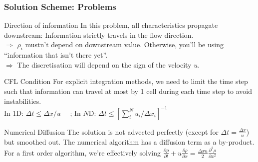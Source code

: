 \begin{frame}
	\frametitle{Solution Scheme: Problems}
	
	\begin{block}{Direction of information}
		In this problem, all characteristics propagate downstream: Information strictly travels in the flow direction.\\
		$\Rightarrow$ $\rho_i$ mustn't depend on downstream value. Otherwise, you'll be using ``information that isn't there yet''.\\
		$\Rightarrow$ The discretisation will depend on the sign of the velocity $u$.
	\end{block}

	\begin{block}{CFL Condition}
		For explicit integration methods, we need to limit the time step such that information can travel at most by 1 cell during each time step to avoid instabilities.\\
		In 1D: $\Delta t \leq \Delta x / u\quad$ ;  In $N$D: $\Delta t \leq [\sum_i^N u_i / \Delta x_i ]^{-1}$
	\end{block}

	\begin{block}{Numerical Diffusion}
		The solution is not advected perfectly (except for $\Delta t = \frac{\Delta x}{u}$) but smoothed out. 
		The numerical algorithm has a diffusion term as a by-product.
		For a first order algorithm, we're effectively solving $\frac{\partial \rho}{\partial t} + u \frac{\partial \rho}{\partial x} = \frac{\Delta x u}{2}\frac{\partial^2 \rho}{\partial x^2}$
	\end{block}

\end{frame}






